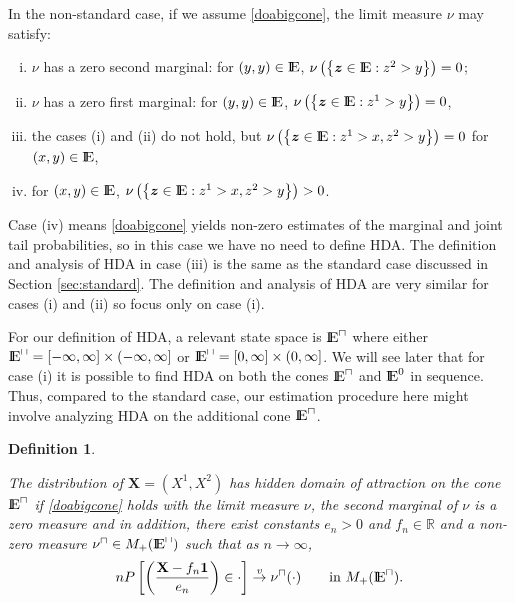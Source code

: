 \documentclass[11 pt]{amsart}
\newtheorem{defn}[thm]{Definition}
\numberwithin{equation}{section}
\begin{document}
{{ In the non-standard case, if we assume
\eqref{doabigcone}, the limit measure $\nu$ may satisfy:
\begin{enumerate}[(i)]
\item  $\nu$ has a zero second marginal: for $(y,y) \in
  {\mathop{\rm I\kern -0.20em E}\nolimits}$, $\nu\left( \left \{ {\boldsymbol z} \in {\mathop{\rm I\kern -0.20em E}\nolimits} : z^2 > y \right \}
  \right) = 0$;
\item  $\nu$ has a zero first marginal: for $(y,y) \in {\mathop{\rm I\kern -0.20em E}\nolimits}$, $\nu\left( \left \{ {\boldsymbol z} \in {\mathop{\rm I\kern -0.20em E}\nolimits} : z^1 > y \right \} \right) = 0$,
\item the cases (i) and (ii) do not hold, but $\nu\left( \left \{ {\boldsymbol z} \in {\mathop{\rm I\kern -0.20em E}\nolimits} : z^1 > x, z^2 > y \right \} \right) = 0$ for $(x, y) \in {\mathop{\rm I\kern -0.20em E}\nolimits}$,
\item for $(x, y) \in {\mathop{\rm I\kern -0.20em E}\nolimits}$, $\nu\left( \left \{ {\boldsymbol z} \in {\mathop{\rm I\kern -0.20em E}\nolimits} : z^1 > x, z^2 > y \right \} \right) > 0$.
\end{enumerate} 

Case (iv) means \eqref{doabigcone} yields
non-zero estimates of the marginal and joint tail probabilities, so
in this case we have no need to define HDA. The definition and analysis of
HDA in case (iii) is the same as the standard case discussed in
Section  
\ref{sec:standard}. {The definition and analysis of HDA are very
  similar for cases (i) and (ii) so focus only on case (i).}

For our definition of HDA,  a relevant state space  is
  ${\mathop{\rm I\kern -0.20em E}\nolimits}^{\sqcap}$ 
where either ${\mathop{\rm I\kern -0.20em E}\nolimits}^{\sqcap} = [-\infty, \infty] \times (-\infty, \infty]$ or
${\mathop{\rm I\kern -0.20em E}\nolimits}^{\sqcap}= [0, \infty] \times (0, \infty]$. We will see
later that for  case (i) it is possible to find HDA on both the cones ${\mathop{\rm I\kern -0.20em E}\nolimits}^{\sqcap}$
and ${\mathop{\rm I\kern -0.20em E}\nolimits}^0$ in sequence. Thus, compared to the standard case,
our estimation procedure here might involve analyzing HDA on the
additional cone ${\mathop{\rm I\kern -0.20em E}\nolimits}^{\sqcap}$. 

\begin{defn}\label{defn:hiddendoamediumcone}
{\rm{The distribution of ${\boldsymbol X} = (X^1, X^2)$ has hidden domain of
    attraction on the cone ${\mathop{\rm I\kern -0.20em E}\nolimits}^{\sqcap}$ if \eqref{doabigcone} holds
    with the limit measure $\nu$, the second marginal of $\nu$ is a
    zero measure and in addition, there exist 
    constants $ e_n>0$ and $ f_n \in \mathbb{R}$ and a non-zero measure
    $\nu^{\sqcap} \in M_+({\mathop{\rm I\kern -0.20em E}\nolimits}^{\sqcap})$ such that  
 as $n \to \infty$,
\begin{align}\label{eqn:hiddendoamediumcone}
nP\left[ \left( \frac{{{\bf{X}} -f_n{\bf{1}}}}{e_n} \right) \in
  \cdot \right] \stackrel{v}{\rightarrow} \nu^{\sqcap}(\cdot)\qquad 
\text{in }M_+({\mathop{\rm I\kern -0.20em E}\nolimits}^{\sqcap}).
\end{align}

}}
\end{defn}}}
\end{document}
